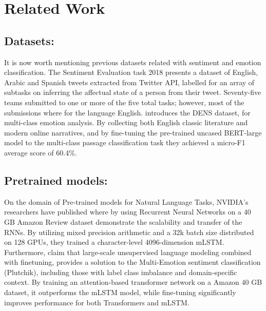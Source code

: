 \documentclass[11pt]{article}
\begin{document}
\section{Related Work}
\label{sec:related}
\subsection{Datasets:}
It is now worth mentioning previous datasets related with sentiment and emotion classification. The Sentiment Evaluation task 2018 \cite{SemEval2018Task1} presents a dataset of English, Arabic and Spanish tweets extracted from Twitter API, labelled for an array of subtasks on inferring the affectual state of a person from their tweet. Seventy-five teams submitted to one or more of the five total tasks; however, most of the submissions where for the language English. 
\cite{liu2019dens} introduces the DENS dataset, for multi-class emotion analysis. By collecting both English classic literature and modern online narratives, and by fine-tuning the pre-trained uncased BERT-large model to the multi-class passage classification task they achieved a micro-F1 average score of 60.4\%.

\subsection{Pretrained models:}
On the domain of Pre-trained models for Natural Language Tasks, NVIDIA's researchers have published 
\cite{puri2018large} where by using Recurrent Neural Networks on a 40 GB Amazon Review dataset demonstrate 
the scalability and transfer of the RNNs. By utilizing mixed precision arithmetic and 
a 32k batch size distributed on 128 GPUs, they trained a character-level 4096-dimension mLSTM.
Furthermore, \cite{kant2018practical} claim that large-scale unsupervised language modeling combined 
with finetuning, provides a solution to the Multi-Emotion sentiment classification (Plutchik),
including those with label class imbalance and domain-specific context. By training an attention-based
transformer network on a Amazon 40 GB dataset, it outperforms the mLSTM model, while fine-tuning significantly 
improves performance for both Transformers and mLSTM.

\end{document}
